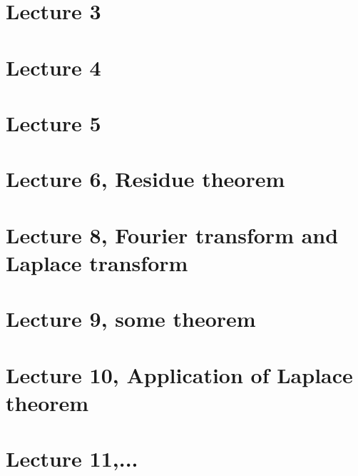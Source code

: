 \documentclass[a4paper,11pt]{article}
\begin{document}
\section{Lecture 3}

\section{Lecture 4}

\section{Lecture 5}

\section{Lecture 6, Residue theorem}

\section{Lecture 8, Fourier transform and Laplace transform}

\section{Lecture 9, some theorem}

\section{Lecture 10, Application of Laplace theorem}


\section{Lecture 11,...}

\end{document}
